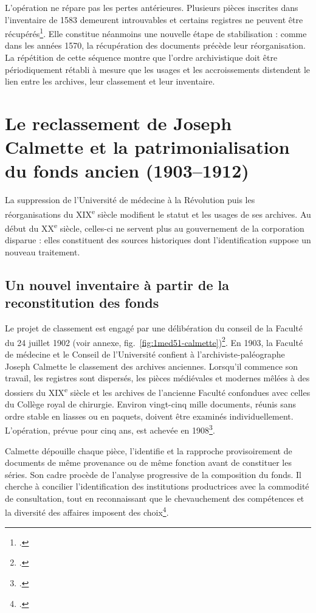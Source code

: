 L'opération ne répare pas les pertes antérieures. Plusieurs pièces inscrites dans l'inventaire de 1583 demeurent introuvables et certains registres ne peuvent être récupérés\footcite[p.~XVII--XVIII]{CalmetteCartulaire1912}. Elle constitue néanmoins une nouvelle étape de stabilisation : comme dans les années 1570, la récupération des documents précède leur réorganisation. La répétition de cette séquence montre que l'ordre archivistique doit être périodiquement rétabli à mesure que les usages et les accroissements distendent le lien entre les archives, leur classement et leur inventaire.

\section{Le reclassement de Joseph Calmette et la patrimonialisation du fonds ancien (1903--1912)}

La suppression de l'Université de médecine à la Révolution puis les réorganisations du XIX\textsuperscript{e} siècle modifient le statut et les usages de ses archives. Au début du XX\textsuperscript{e} siècle, celles-ci ne servent plus au gouvernement de la corporation disparue : elles constituent des sources historiques dont l'identification suppose un nouveau traitement.

\subsection{Un nouvel inventaire à partir de la reconstitution des fonds}

Le projet de classement est engagé par une délibération du conseil de la Faculté du 24 juillet 1902 (voir annexe, fig.~\ref{fig:1med51-calmette})\footcite{AHFM1MED51}. En 1903, la Faculté de médecine et le Conseil de l'Université confient à l'archiviste-paléographe Joseph Calmette le classement des archives anciennes. Lorsqu'il commence son travail, les registres sont dispersés, les pièces médiévales et modernes mêlées à des dossiers du XIX\textsuperscript{e} siècle et les archives de l'ancienne Faculté confondues avec celles du Collège royal de chirurgie. Environ vingt-cinq mille documents, réunis sans ordre stable en liasses ou en paquets, doivent être examinés individuellement. L'opération, prévue pour cinq ans, est achevée en 1908\footcite[p.~I, vue~20 de la version numérisée]{CalmetteCartulaire1912}.

Calmette dépouille chaque pièce, l'identifie et la rapproche provisoirement de documents de même provenance ou de même fonction avant de constituer les séries. Son cadre procède de l'analyse progressive de la composition du fonds. Il cherche à concilier l'identification des institutions productrices avec la commodité de consultation, tout en reconnaissant que le chevauchement des compétences et la diversité des affaires imposent des choix\footcite[p. I-II, vues~20 à 21 de la version numérisée]{CalmetteCartulaire1912}.

